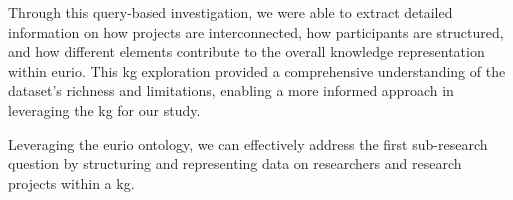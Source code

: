 Through this query-based investigation, we were able to extract detailed information on how projects are interconnected, how participants are structured, and how different elements contribute to the overall knowledge representation within \gls{eurio}.
This \gls{kg} exploration provided a comprehensive understanding of the dataset's richness and limitations, enabling a more informed approach in leveraging the \gls{kg} for our study.

Leveraging the \gls{eurio} ontology, we can effectively address the first sub-research question by structuring and representing data on researchers and research projects within a \gls{kg}.